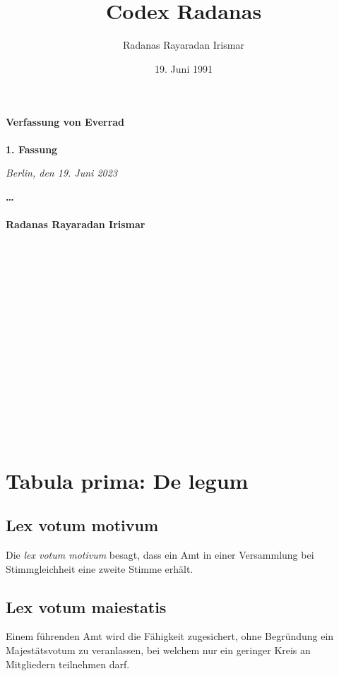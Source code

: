 \documentclass{article}
\title{Codex Radanas}
\author{Radanas Rayaradan Irismar}
\date{19. Juni 1991}
\begin{document}
\maketitle
\vspace*{\fill}
\paragraph{Verfassung von Everrad}

\newpage
{}
\vspace*{\fill}
\begin{Center}
\textbf{1. Fassung}
\end{Center}
\begin{flushright}
\textit{Berlin, den 19. Juni 2023}
\end{flushright}
\textbf{\ldots}
\\\\
\textbf{Radanas Rayaradan Irismar}
\\\\\\\\\\\\\\\\\\\\\\\\\\\\\\\\
\vspace*{\fill}

\newpage
\tableofcontents
\newpage
\section{Tabula prima: De legum}
\subsection{Lex votum motivum}
Die \textit{lex votum motivum} besagt, dass ein Amt in einer Versammlung bei Stimmgleichheit eine zweite Stimme erhält.

\subsection{Lex votum maiestatis}
Einem führenden Amt wird die Fähigkeit zugesichert, ohne Begründung ein Majestätsvotum zu veranlassen, bei welchem nur ein geringer Kreis an Mitgliedern teilnehmen darf.
\end{document}
